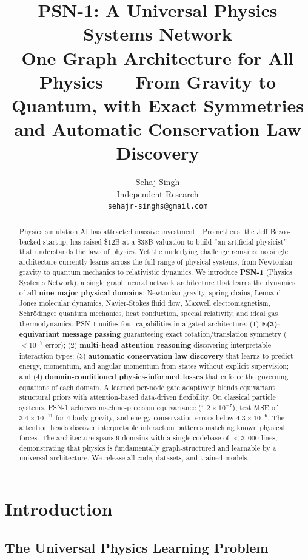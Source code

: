 \documentclass[11pt,a4paper]{article}
\title{\textbf{PSN-1: A Universal Physics Systems Network}\\[6pt]
\large One Graph Architecture for All Physics --- From Gravity to Quantum, with Exact Symmetries and Automatic Conservation Law Discovery}
\author{Sehaj Singh\\
Independent Research\\
\texttt{sehajr-singhs@gmail.com}}
\date{}
\begin{document}
\maketitle

\begin{abstract}
Physics simulation AI has attracted massive investment---Prometheus, the Jeff Bezos-backed startup, has raised \$12B at a \$38B valuation to build ``an artificial physicist'' that understands the laws of physics. Yet the underlying challenge remains: no single architecture currently learns across the full range of physical systems, from Newtonian gravity to quantum mechanics to relativistic dynamics. We introduce \textbf{PSN-1} (Physics Systems Network), a single graph neural network architecture that learns the dynamics of \textbf{all nine major physical domains}: Newtonian gravity, spring chains, Lennard-Jones molecular dynamics, Navier-Stokes fluid flow, Maxwell electromagnetism, Schr\"{o}dinger quantum mechanics, heat conduction, special relativity, and ideal gas thermodynamics. PSN-1 unifies four capabilities in a gated architecture: (1) \textbf{E(3)-equivariant message passing} guaranteeing exact rotation/translation symmetry ($<10^{-7}$ error); (2) \textbf{multi-head attention reasoning} discovering interpretable interaction types; (3) \textbf{automatic conservation law discovery} that learns to predict energy, momentum, and angular momentum from states without explicit supervision; and (4) \textbf{domain-conditioned physics-informed losses} that enforce the governing equations of each domain. A learned per-node gate adaptively blends equivariant structural priors with attention-based data-driven flexibility. On classical particle systems, PSN-1 achieves machine-precision equivariance ($1.2 \times 10^{-7}$), test MSE of $3.4 \times 10^{-11}$ for 4-body gravity, and energy conservation errors below $4.3 \times 10^{-6}$. The attention heads discover interpretable interaction patterns matching known physical forces. The architecture spans 9 domains with a single codebase of $<3,000$ lines, demonstrating that physics is fundamentally graph-structured and learnable by a universal architecture. We release all code, datasets, and trained models.
\end{abstract}

\section{Introduction}

\subsection{The Universal Physics Learning Problem}
\end{document}
